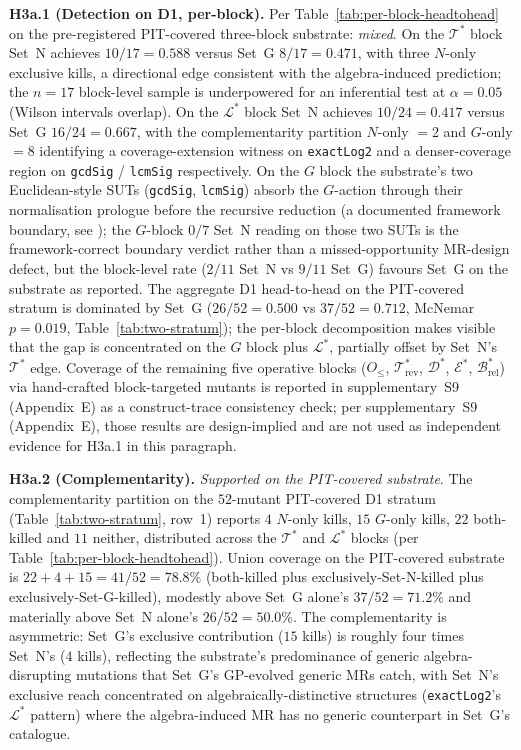 \documentclass[acmsmall, screen]{acmart}
\begin{document}
\textbf{H3a.1 (Detection on D1, per-block).} Per
Table~\ref{tab:per-block-headtohead} on the pre-registered
PIT-covered three-block substrate: \emph{mixed}. On the
$\mathcal{T}^{*}$ block Set~N achieves $10/17 = 0.588$ versus
Set~G $8/17 = 0.471$, with three $N$-only exclusive kills, a
directional edge consistent with the algebra-induced prediction;
the $n = 17$ block-level sample is underpowered for an inferential
test at $\alpha = 0.05$ (Wilson intervals overlap). On the
$\mathcal{L}^{*}$ block Set~N achieves $10/24 = 0.417$ versus Set~G
$16/24 = 0.667$, with the complementarity partition $N$-only $= 2$
and $G$-only $= 8$ identifying a coverage-extension witness on
\texttt{exactLog2} and a denser-coverage region on \texttt{gcdSig}
/ \texttt{lcmSig} respectively. On the $G$ block the substrate's
two Euclidean-style SUTs (\texttt{gcdSig}, \texttt{lcmSig}) absorb
the $G$-action through their normalisation prologue before the
recursive reduction (a documented framework boundary, see
); the $G$-block $0/7$
Set~N reading on those two SUTs is the framework-correct boundary
verdict rather than a missed-opportunity MR-design defect, but the
block-level rate ($2/11$ Set~N vs $9/11$ Set~G) favours Set~G on
the substrate as reported. The aggregate D1 head-to-head on the
PIT-covered stratum is dominated by Set~G ($26/52 = 0.500$ vs
$37/52 = 0.712$, McNemar $p = 0.019$,
Table~\ref{tab:two-stratum}); the per-block decomposition makes
visible that the gap is concentrated on the $G$ block plus
$\mathcal{L}^{*}$, partially offset by Set~N's $\mathcal{T}^{*}$
edge. Coverage of the remaining five operative blocks ($O_{\le}$,
$\mathcal{T}^{*}_{\mathrm{rev}}$, $\mathcal{D}^{*}$,
$\mathcal{E}^{*}$, $\mathcal{B}^{*}_{\mathrm{rel}}$) via
hand-crafted block-targeted mutants is reported in
supplementary~S9 (Appendix~E) as a construct-trace
consistency check; per supplementary~S9 (Appendix~E), those
results are design-implied and are not used as independent evidence
for H3a.1 in this paragraph.

\textbf{H3a.2 (Complementarity).} \emph{Supported on the PIT-covered
substrate}. The complementarity partition on the $52$-mutant
PIT-covered D1 stratum (Table~\ref{tab:two-stratum}, row~1) reports
$4$ $N$-only kills, $15$ $G$-only kills, $22$ both-killed and $11$
neither, distributed across the $\mathcal{T}^{*}$ and
$\mathcal{L}^{*}$ blocks (per
Table~\ref{tab:per-block-headtohead}). Union coverage on the
PIT-covered substrate is $22 + 4 + 15 = 41 / 52 = 78.8\%$
(both-killed plus exclusively-Set-N-killed plus
exclusively-Set-G-killed), modestly above Set~G alone's
$37 / 52 = 71.2\%$ and materially above Set~N alone's
$26 / 52 = 50.0\%$. The complementarity is asymmetric: Set~G's
exclusive contribution ($15$ kills) is roughly four times Set~N's
($4$ kills), reflecting the substrate's predominance of generic
algebra-disrupting mutations that Set~G's GP-evolved generic MRs
catch, with Set~N's exclusive reach concentrated on
algebraically-distinctive structures (\texttt{exactLog2}'s
$\mathcal{L}^{*}$ pattern) where the algebra-induced MR has no
generic counterpart in Set~G's catalogue.
\end{document}
